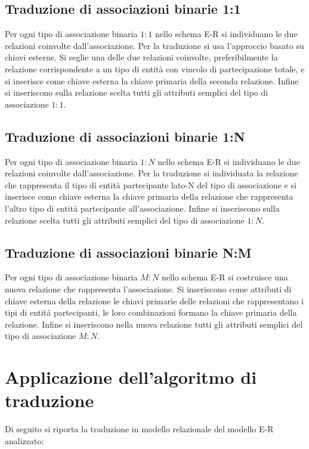 \subsection{Traduzione di associazioni binarie 1:1}
	Per ogni tipo di associazione binaria $1:1$ nello schema E-R si individuano le due relazioni coinvolte dall'associazione. Per la traduzione si usa l'approccio basato su chiavi esterne. Si seglie una delle due relazioni coinvolte, preferibilmente la relazione corrispondente a un tipo di entità con vincolo di partecipazione totale, e si inserisce come chiave esterna la chiave primaria della seconda relazione. Infine si inseriscono sulla relazione scelta tutti gli attributi semplici del tipo di associazione $1:1$.

\subsection{Traduzione di associazioni binarie 1:N}
	Per ogni tipo di associazione binaria $1:N$ nello schema E-R si individuano le due relazioni coinvolte dall'associazione. Per la traduzione si individuata la relazione che rappresenta il tipo di entità partecipante lato-N del tipo di associazione e si inserisce come chiave esterna la chiave primaria della relazione che rappresenta l'altro tipo di entità partecipante all'associazione. Infine si inseriscono sulla relazione scelta tutti gli attributi semplici del tipo di associazione $1:N$.

\subsection{Traduzione di associazioni binarie N:M}
	Per ogni tipo di associazione binaria $M:N$ nello schema E-R si costruisce una nuova relazione che rappresenta l'associazione. Si inseriscono come attributi di chiave esterna della relazione le chiavi primarie delle relazioni che rappresentano i tipi di entità partecipanti, le loro combinazioni formano la chiave primaria della relazione. Infine si inseriscono nella nuova relazione tutti gli attributi semplici del tipo di associazione $M:N$.

\section{Applicazione dell'algoritmo di traduzione}
	Di seguito si riporta la traduzione in modello relazionale del modello E-R analizzato:
	
